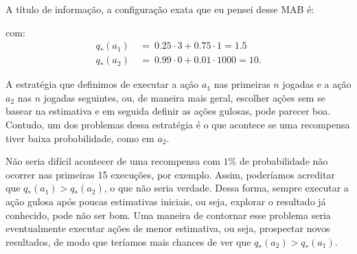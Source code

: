 \documentclass{article}
\begin{document}
            A título de informação, a configuração exata que eu pensei desse MAB é:
            \begin{center}
            \end{center}
            com:
            \begin{equation*}
            \begin{split}
                q_*(a_1) & \ = \ 0.25 \cdot 3 + 0.75 \cdot 1 = 1.5 \\
                q_*(a_2) & \ = \ 0.99 \cdot 0 + 0.01 \cdot 1000 = 10 .
            \end{split}                
            \end{equation*}

            A estratégia que definimos de executar a ação $a_1$ nas primeiras $n$ jogadas e a ação $a_2$ nas $n$ jogadas seguintes, ou, de maneira mais geral, escolher ações sem se basear na estimativa e em seguida definir as ações gulosas, pode parecer boa. Contudo, um dos problemas dessa estratégia é o que acontece se uma recompensa tiver baixa probabilidade, como em $a_2$. 

            Não seria difícil acontecer de uma recompensa com $1\%$ de probabilidade não ocorrer nas primeiras 15 execuções, por exemplo. Assim, poderíamos acreditar que $q_*(a_1) > q_*(a_2)$, o que não seria verdade. Dessa forma, sempre executar a ação gulosa após poucas estimativas iniciais, ou seja, explorar o resultado já conhecido, pode não ser bom. Uma maneira de contornar esse problema seria eventualmente executar ações de menor estimativa, ou seja, prospectar novos resultados, de modo que teríamos mais chances de ver que $q_*(a_2) > q_*(a_1)$.
\end{document}
